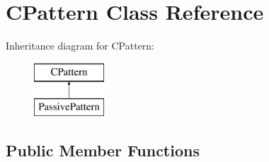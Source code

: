 \hypertarget{class_c_pattern}{\section{C\+Pattern Class Reference}
\label{class_c_pattern}
}
Inheritance diagram for C\+Pattern\+:\begin{figure}[H]
\begin{center}
\leavevmode
\includegraphics[height=2.000000cm]{class_c_pattern}
\end{center}
\end{figure}
\subsection*{Public Member Functions}
